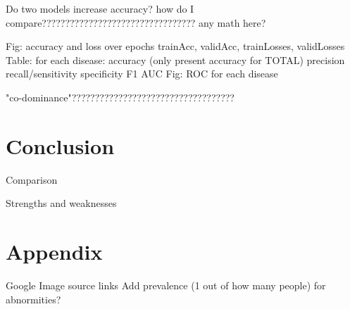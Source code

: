 \documentclass{article}
\begin{document}
			Do two models increase accuracy?
				how do I compare?????????????????????????????????
				any math here?
			
			Fig: accuracy and loss over epochs
				trainAcc, validAcc, trainLosses, validLosses
			Table: for each disease:
				accuracy (only present accuracy for TOTAL)
				precision
				recall/sensitivity
				specificity
				F1
				AUC
			Fig: ROC for each disease
	
			"co-dominance"???????????????????????????????????
	
	\section{Conclusion}
	
		Comparison
		
		Strengths and weaknesses
	
	\section{Appendix}
	
		Google Image source links
		Add prevalence (1 out of how many people) for abnormities?
		
\end{document}
